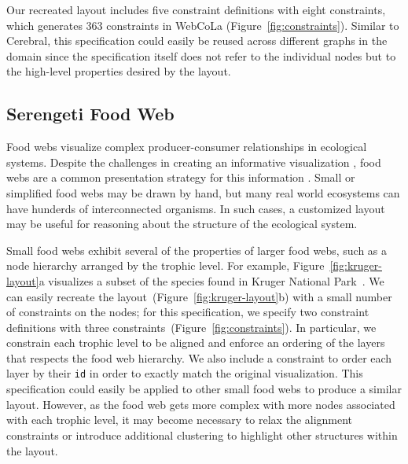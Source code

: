 Our recreated layout includes five constraint definitions with eight \projectname
constraints, which generates $363$ constraints in WebCoLa (Figure~\ref{fig:constraints}).
Similar to Cerebral, this \projectname specification could easily be reused 
across different graphs in the domain since the specification itself does
not refer to the individual nodes but to the high-level properties desired
by the layout.



\subsection{Serengeti Food Web}
\krugerLayout
\serengetiLayout
\serengetiSpec

Food webs visualize complex producer-consumer relationships in ecological
systems. Despite the challenges in creating an informative
visualization \cite{kearney2016blog}, food webs are a common presentation strategy for this information
\cite{hinke2004visualizing,harper2006dynamic,lavigne1996cod,baskerville2011spatial,yodzis1998local,cohen2003ecological,benson2016higher,kruger2017}. Small or simplified food webs may be
drawn by hand, but many real world ecosystems can have hunderds of
interconnected organisms. In such cases, a customized layout may be useful
for reasoning about the structure of the ecological system.

Small food webs exhibit several of the properties of larger food webs, such
as a node hierarchy arranged by the trophic level.
For example, Figure~\ref{fig:kruger-layout}a visualizes a subset of the
species found in Kruger National Park~\cite{kruger2017}. We can easily 
recreate the layout~(Figure~\ref{fig:kruger-layout}b) with a small 
number of constraints on the nodes; for this specification, we specify 
two constraint definitions with three constraints~(Figure~\ref{fig:constraints}).
In particular, we constrain each trophic level to be aligned and enforce an
ordering of the layers that respects the food web hierarchy. We also
include a constraint to order each layer by their \texttt{id} in order
to exactly match the original visualization. This \projectname specification 
could easily be applied to other small food webs to produce a similar layout.
However, as the food web gets more complex with more nodes associated with
each trophic level, it may become necessary to relax the alignment
constraints or introduce additional clustering to highlight other
structures within the layout.

